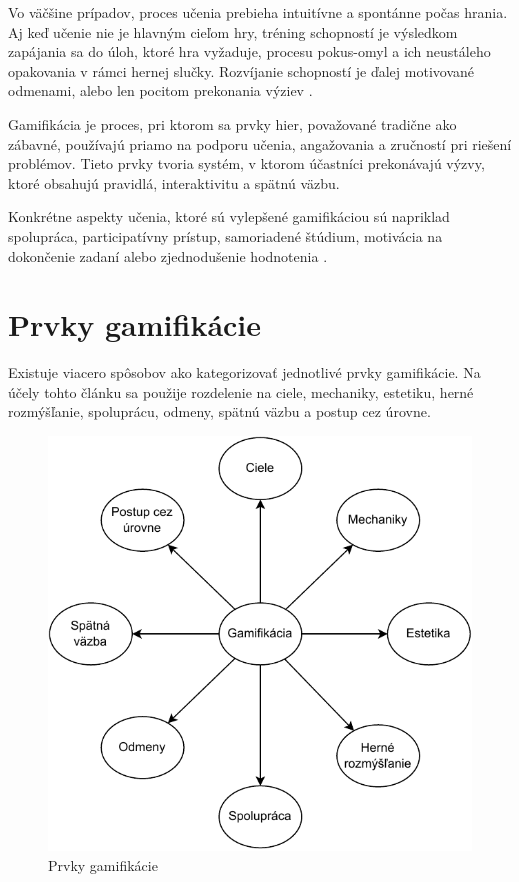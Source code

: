 \documentclass[10pt,twoside,slovak,a4paper]{article}
\begin{document}
Vo väčšine prípadov, proces učenia prebieha intuitívne a spontánne počas hrania. Aj keď učenie nie je hlavným cieľom hry, tréning schopností je výsledkom zapájania sa do úloh, ktoré hra vyžaduje, procesu pokus-omyl a ich neustáleho opakovania v rámci hernej slučky. Rozvíjanie schopností je ďalej motivované odmenami, alebo len pocitom prekonania výziev \cite{Rego}.

Gamifikácia je proces, pri ktorom sa prvky hier, považované tradične ako zábavné, používajú priamo na podporu učenia, angažovania a zručností pri riešení problémov. Tieto prvky tvoria systém, v ktorom účastníci prekonávajú výzvy, ktoré obsahujú pravidlá, interaktivitu a spätnú väzbu.

Konkrétne aspekty učenia, ktoré sú vylepšené gamifikáciou sú napriklad spolupráca, participatívny prístup, samoriadené štúdium, motivácia na dokončenie zadaní alebo zjednodušenie hodnotenia \cite{Kapp}.

\section{Prvky gamifikácie} \label{prvky}

Existuje viacero spôsobov ako kategorizovať jednotlivé prvky gamifikácie. Na účely tohto článku sa použije rozdelenie na ciele, mechaniky, estetiku, herné rozmýšľanie, spoluprácu, odmeny, spätnú väzbu a postup cez úrovne.

\begin{figure}[tbh]
\centering
\includegraphics[scale=0.75]{prvky.pdf}
\caption{Prvky gamifikácie}
\label{f:prvky}
\end{figure}
\end{document}
